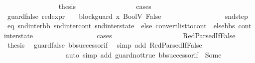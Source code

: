 \begin{isabellebody}
\ \ \ \ \ \ \ \ \ \ \ \ \ \ \isamarkupfalse%
\ {\isacharquery}{\kern0pt}thesis\ \isanewline
\ \ \ \ \ \ \ \ \ \ \ \ \ \ \isamarkupfalse%
\ cases\isanewline
\ \ \ \ \ \ \ \ \ \ \ \ \ \ \ \ \isamarkupfalse%
\ guard{\isacharunderscore}{\kern0pt}false{\isacharcolon}{\kern0pt}\ {\isachardoublequoteopen}{\isacharparenleft}{\kern0pt}red{\isacharunderscore}{\kern0pt}expr\ {\isasymLambda}\ {\isasymGamma}\ {\isasymOmega}\ block{\isacharunderscore}{\kern0pt}guard\ x{}\ {\isacharparenleft}{\kern0pt}BoolV\ False{\isacharparenright}{\kern0pt}{\isacharparenright}{\kern0pt}{\isachardoublequoteclose}\isanewline
\ \ \ \ \ \ \ \ \ \ \ \ \ \ \ \ \isamarkupfalse%
\ snd{\isacharunderscore}{\kern0pt}step\ \isamarkupfalse%
\ eq{\isacharcolon}{\kern0pt}\ {\isachardoublequoteopen}{\isacharparenleft}{\kern0pt}snd{\isacharunderscore}{\kern0pt}inter{\isacharunderscore}{\kern0pt}bb{\isacharcomma}{\kern0pt}\ snd{\isacharunderscore}{\kern0pt}inter{\isacharunderscore}{\kern0pt}cont{\isacharcomma}{\kern0pt}\ snd{\isacharunderscore}{\kern0pt}inter{\isacharunderscore}{\kern0pt}state{\isacharparenright}{\kern0pt}\ {\isacharequal}{\kern0pt}\ {\isacharparenleft}{\kern0pt}else{}{\isacharcomma}{\kern0pt}\ convert{\isacharunderscore}{\kern0pt}list{\isacharunderscore}{\kern0pt}to{\isacharunderscore}{\kern0pt}cont\ {\isacharparenleft}{\kern0pt}\ else{\isacharunderscore}{\kern0pt}bbs{\isacharparenright}{\kern0pt}\ cont{}{\isacharcomma}{\kern0pt}\ inter{\isacharunderscore}{\kern0pt}state{\isacharparenright}{\kern0pt}{\isachardoublequoteclose}\isanewline
\ \ \ \ \ \ \ \ \ \ \ \ \ \ \ \ \isamarkupfalse%
\ cases\isanewline
\ \ \ \ \ \ \ \ \ \ \ \ \ \ \ \ \ \ \isamarkupfalse%
\ RedParsedIfFalse\ \isamarkupfalse%
\ {\isacharquery}{\kern0pt}thesis\ \isamarkupfalse%
\ guard{\isacharunderscore}{\kern0pt}false\ bb{\isacharunderscore}{\kern0pt}successor{\isacharunderscore}{\kern0pt}if\ \isamarkupfalse%
\ {\isacharparenleft}{\kern0pt}simp\ add{\isacharcolon}{\kern0pt}\ RedParsedIfFalse{\isacharparenright}{\kern0pt}\isanewline
\ \ \ \ \ \ \ \ \ \ \ \ \ \ \ \ \isamarkupfalse%
\ {\isacharparenleft}{\kern0pt}auto\ simp\ add{\isacharcolon}{\kern0pt}\ guard{\isacharunderscore}{\kern0pt}not{\isacharunderscore}{\kern0pt}true\ bb{\isacharunderscore}{\kern0pt}successor{\isacharunderscore}{\kern0pt}if\ {}\ Some{\isacharparenright}{\kern0pt}\isanewline

\end{isabellebody}
